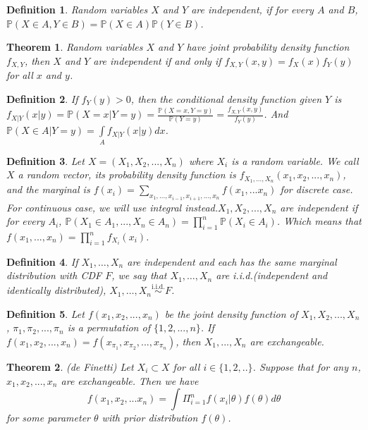 \documentclass[11pt]{article}
\def\BP{{\bf P}}
\def\BP{{\mathbb P}}
\newtheorem{theorem}{Theorem}[section]
\newtheorem{definition}{Definition}[section]
\begin{document}
\begin{definition}
Random variables $X$ and $Y$ are independent, if for every $A$ and $B$, $\BP(X\in A, Y\in B) = \BP(X\in A)\BP(Y\in B)$.
\end{definition}

\begin{theorem}
Random variables $X$ and $Y$ have joint probability density function $f_{X,Y}$, then $X$ and $Y$ are independent if and only if $f_{X,Y}(x,y) = f_X(x) f_Y(y)$ for all $x$ and $y$.
\end{theorem}

\begin{definition}
If $f_Y(y) > 0$, then the conditional density function given $Y$ is $f_{X|Y}(x | y) = \BP(X = x| Y = y) = \frac{\BP(X=x, Y= y)}{\BP(Y= y)} = \frac{f_{X,Y}(x, y)}{f_Y(y)}$. And $\BP(X\in A|Y=y)=\int\limits_Af_{X|Y}(x|y)dx$.
\end{definition}

\begin{definition}
Let $X = (X_1, X_2, ..., X_n)$ where $X_i$ is a random variable. We call $X$ a random vector, its probability density function is $f_{X_1, ..., X_n}(x_1, x_2, ..., x_n)$, and the marginal is $f(x_i)= \sum_{x_1, ..., x_{i-1}, x_{i+1}, ..., x_n} f(x_1, ... x_n)$ for discrete case. For continuous case, we will use integral instead.$X_1, X_2, ..., X_n$ are independent if for every $A_i$, $\BP(X_1\in A_1, ... ,X_n\in A_n)=\prod_{i=1}^n\BP(X_i\in A_i)$. Which means that $f(x_1,...,x_n)=\prod_{i=1}^nf_{X_i}(x_i)$.
 
\end{definition}

\begin{definition}
If $X_1,\dots,X_n$ are independent and each has the same marginal distribution with CDF $F$, we say that $X_1,\dots,X_n$ are i.i.d.(independent and identically distributed), $X_1,\dots,X_n\stackrel{\text{i.i.d.}}{\sim}F$.
\end{definition}
\begin{definition}
Let $f(x_1, x_2, ..., x_n)$ be the joint density function of $X_1, X_2, ..., X_n$, $\pi_1, \pi_2, ..., \pi_n$ is a permutation of $\{1, 2, ..., n\}$. If $f(x_1, x_2, ..., x_n) = f(x_{\pi_1}, x_{\pi_2}, ..., x_{\pi_n})$, then $X_1, ..., X_n$ are exchangeable.
\end{definition}

\begin{theorem}(de Finetti)
Let $X_i \subset X$ for all $i\in\{1, 2, ..\}$. Suppose that for any $n$, $x_1, x_2, ..., x_n$ are exchangeable. Then we have \[f(x_1, x_2, ... x_n) = \int \Pi_{i=1}^n f(x_i | \theta) f(\theta) d\theta\] for some parameter $\theta$ with prior distribution $f(\theta)$.
\end{theorem}
\end{document}
